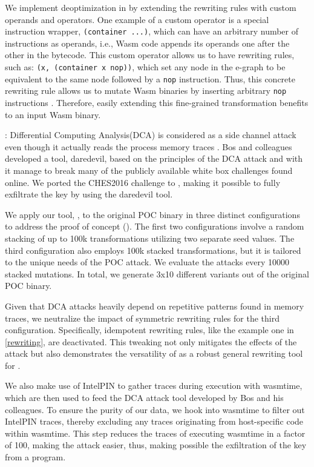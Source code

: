 We implement deoptimization in \tool by extending the rewriting rules with custom operands and operators.
One example of a custom operator is a special instruction wrapper, \texttt{(container ...)}, which can have an arbitrary number of instructions as operands, i.e., Wasm code appends its operands one after the other in the bytecode. 
This custom operator allows us to have rewriting rules, such as: \texttt{(x, (container x nop))}, which set any node in the e-graph to be equivalent to the same node followed by a \texttt{nop} instruction.
Thus, this concrete rewriting rule allows us to mutate Wasm binaries by inserting arbitrary \texttt{nop} instructions \cite{6494997, 10.1145/2086696.2086702}.
Therefore, easily extending this fine-grained transformation benefits to an input Wasm binary.



\pocd:  Differential Computing Analysis(DCA) is considered as a side channel attack even though it actually reads the process memory traces \cite{bos2016differential}.
Bos and colleagues developed a tool, daredevil, based on the principles of the DCA attack and with it manage to break many of the publicly available white box challenges found online.
We ported the CHES2016 challenge to \Wasm, making it possible to fully exfiltrate the key by using the daredevil tool.


We apply our tool, \tool, to the original POC binary in three distinct configurations to address the proof of concept (\pocd). 
The first two configurations involve a random stacking of up to 100k transformations utilizing two separate seed values. 
The third configuration also employs 100k stacked transformations, but it is tailored to the unique needs of the POC attack.
We evaluate the attacks every 10000 stacked mutations.
In total, we generate 3x10 different variants out of the original POC binary.

Given that DCA attacks heavily depend on repetitive patterns found in memory traces, we neutralize the impact of symmetric rewriting rules for the third configuration. 
Specifically, idempotent rewriting rules, like the example one in \autoref{rewriting}, are deactivated. 
This tweaking not only mitigates the effects of the attack but also demonstrates the versatility of \tool as a robust general rewriting tool for \Wasm.

We also make use of IntelPIN to gather \wasm traces during execution with wasmtime, which are then used to feed the DCA attack tool developed by Bos and his colleagues. 
To ensure the purity of our data, we hook into wasmtime to filter out IntelPIN traces, thereby excluding any traces originating from host-specific code within wasmtime.
This step reduces the traces of executing wasmtime in a factor of 100, making the attack easier, thus, making possible the exfiltration of the key from a \Wasm program.

